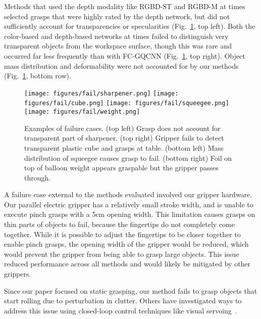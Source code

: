Methods that used the depth modality like RGBD-ST and RGBD-M at times selected grasps that were highly rated by the depth network, but did not sufficiently account for transparencies or specularities (Fig.~\ref{fig:fail}, top left).
Both the color-based and depth-based networks at times failed to distinguish very transparent objects from the workspace surface, though this was rare and occurred far less frequently than with FC-GQCNN (Fig.~\ref{fig:fail}, top right).  
Object mass distribution and deformability were not accounted for by our methods (Fig.~\ref{fig:fail}, bottom row).

\begin{figure}[h]
    \centering
    \texttt{[image: figures/fail/sharpener.png]}
    \vspace{0.3em}
    \texttt{[image: figures/fail/cube.png]}
    \texttt{[image: figures/fail/squeegee.png]}
    \texttt{[image: figures/fail/weight.png]}
    \caption{Examples of failure cases. (top left) Grasp does not account for transparent part of sharpener. (top right) Gripper fails to detect transparent plastic cube and grasps at table. (bottom left) Mass distribution of squeegee causes grasp to fail. (bottom right) Foil on top of balloon weight appears graspable but the gripper passes through.}
    \label{fig:fail}
\end{figure}

A failure case external to the methods evaluated involved our gripper hardware.
Our parallel electric gripper has a relatively small stroke width, and is unable to execute pinch grasps with a 5cm opening width.
This limitation causes grasps on thin parts of objects to fail, because the fingertips do not completely come together.
While it is possible to adjust the fingertips to be closer together to enable pinch grasps, the opening width of the gripper would be reduced,  which would prevent the gripper from being able to grasp large objects.
This issue reduced performance across all methods and would likely be mitigated by other grippers.

Since our paper focused on static grasping, our method fails to grasp objects that start rolling due to perturbation in clutter. 
Others have investigated ways to address this issue using closed-loop control techniques like visual servoing~\cite{morrison2018closing}.

